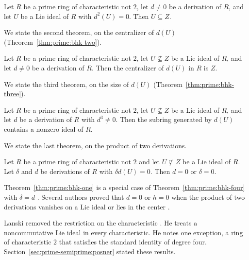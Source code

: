 \begin{theorem}\label{thm:prime:bhk-one}
Let $R$ be a prime ring of characteristic not $2$, let $d\neq 0$ be a derivation
of $R$, and let $U$ be a Lie ideal of $R$ with $d^2(U)=0$. Then $U\subseteq Z$.
\end{theorem}

We state the second theorem, on the centralizer of $d(U)$ (Theorem~\ref{thm:prime:bhk-two}).

\begin{theorem}\label{thm:prime:bhk-two}
Let $R$ be a prime ring of characteristic not $2$, let $U\not\subseteq Z$ be a Lie
ideal of $R$, and let $d\neq 0$ be a derivation of $R$. Then the centralizer of
$d(U)$ in $R$ is $Z$.
\end{theorem}

We state the third theorem, on the size of $d(U)$ (Theorem~\ref{thm:prime:bhk-three}).
\begin{theorem}\label{thm:prime:bhk-three}
Let $R$ be a prime ring of characteristic not $2$, let $U\not\subseteq Z$ be a Lie
ideal of $R$, and let $d$ be a derivation of $R$ with $d^3\neq 0$. Then the
subring generated by $d(U)$ contains a nonzero ideal of $R$.
\end{theorem}

We state the last theorem, on the product of two derivations.

\begin{theorem}\label{thm:prime:bhk-four}
Let $R$ be a prime ring of characteristic not $2$ and let $U\not\subseteq Z$ be a
Lie ideal of $R$. Let $\delta$ and $d$ be derivations of $R$ with
$\delta d(U)=0$. Then $d=0$ or $\delta=0$.
\end{theorem}

Theorem~\ref{thm:prime:bhk-one} is a special case of
Theorem~\ref{thm:prime:bhk-four} with $\delta=d$
\cite[p.~266]{BergenHersteinKerr1981}. Several authors proved that $d=0$ or $h=0$
when the product of two derivations vanishes on a Lie ideal or lies in the center
\cite[p.~275]{Lanski1988}.

Lanski removed the restriction on the characteristic
\cite[p.~276]{Lanski1988}. He treats a noncommutative Lie ideal in every
characteristic. He notes one exception, a ring of characteristic $2$ that satisfies the
standard identity of degree four. Section~\ref{sec:prime-semiprime:posner}
stated these results.

